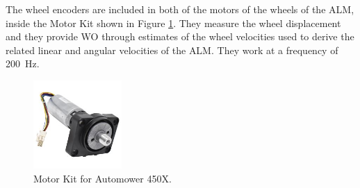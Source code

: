The wheel encoders are included in both of the motors of the wheels of the \gls{ALM}, inside the Motor Kit shown in Figure \ref{fig:wheel}.
They measure the wheel displacement and they provide \gls{WO} through estimates of the wheel velocities used to derive the related linear and angular velocities of the \gls{ALM}.
They work at a frequency of \SI{200}{Hz}.
\begin{figure}[!ht]
	\begin{center}
			\centering
			\includegraphics[width=0.30\textwidth]{Images/4-Methods/MotorEnc.jpeg}
			\caption{Motor Kit for Automower 450X.}
		\label{fig:wheel}
	\end{center}
\end{figure}


